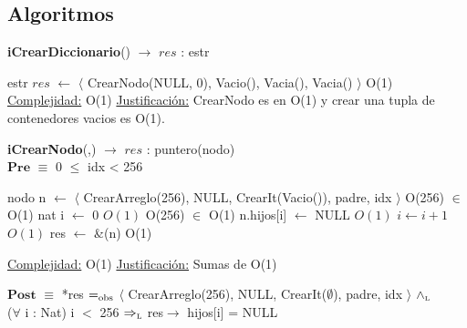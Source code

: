 \subsection{Algoritmos}



\begin{algorithm}[H]{\textbf{iCrearDiccionario}() $\to$ $res$ : estr}
	\begin{algorithmic}[1]
		\State estr $res$ $\gets$ $\langle$ CrearNodo(NULL, 0), Vacio(), Vacia(), Vacia() $\rangle$ \Comment O(1)
		\medskip
		\Statex \underline{Complejidad:} O(1)
		\Statex \underline{Justificación:} CrearNodo es en O(1) y crear una tupla de contenedores vacios es O(1).
    \end{algorithmic}
\end{algorithm}

\begin{algorithm}[H]{\textbf{iCrearNodo}(,) $\to$ $res$ : puntero(nodo)}
	{\\ $\textbf{Pre}$ $\equiv$ 0 $\leq$ idx < 256}
	\begin{algorithmic}[1]

		\State nodo n $\gets$ $\langle$ CrearArreglo(256), NULL, CrearIt(Vacio()), padre, idx $\rangle$  \Comment O(256) $\in$ O(1)
		\State nat i $\gets$ 0 					\Comment $O(1)$
		 								\Comment O(256) $\in$ O(1)
		 	\State n.hijos[i] $\gets$ NULL 		\Comment $O(1)$
			\State $i \gets i + 1$ \Comment $O(1)$
		\EndWhile
		\State res $\gets$ \&(n)          \Comment O(1)

		\medskip
		\Statex \underline{Complejidad:} O(1)
		\Statex \underline{Justificación:} Sumas de O(1)
    \end{algorithmic}
    {$\textbf{Post}$ $\equiv$ *res $=_{\mathrm{obs}}$ $\langle$ CrearArreglo(256), NULL, CrearIt($\emptyset$), padre, idx $\rangle$ $\land_{\mathrm{\scriptscriptstyle{L}}}$ \\ ($\forall$ i : Nat) i $<$ 256 $\Rightarrow_{\mathrm{\scriptscriptstyle{L}}}$ res$\rightarrow$ hijos[i] = NULL  }

\end{algorithm}


